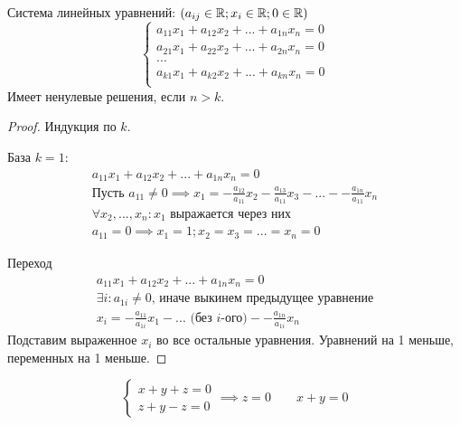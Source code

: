 \documentclass[main]{subfiles}
\begin{document}
\begin{lemma}
    Система линейных уравнений: $(a_{ij} \in \mathbb{R}; x_i \in \mathbb{R}; 0 \in \mathbb{R})$
    \begin{equation*}
        \begin{cases}
            a_{11} x_1 + a_{12}x_2 + ... + a_{1n} x_n = 0 \\
            a_{21} x_1 + a_{22}x_2 + ... + a_{2n} x_n = 0 \\
            ...                                           \\
            a_{k1} x_1 + a_{k2}x_2 + ... + a_{kn} x_n = 0 \\
        \end{cases}
    \end{equation*}
    Имеет ненулевые решения, если $n>k$.
\end{lemma}
\begin{proof}
    Индукция по $k$.

    База $k=1$:
    \begin{gather*}
        a_{11} x_1 + a_{12}x_2 + ... + a_{1n} x_n = 0\\
        \text{Пусть } a_{11} \neq 0 \implies x_1 = -\frac{a_{12}}{a_{11}}x_2
        -\frac{a_{13}}{a_{11}}x_3 - ... - -\frac{a_{1n}}{a_{11}}x_n\\
        \forall x_2,...,x_n: x_1 \text{ выражается через них}\\
        a_{11} = 0 \implies x_1 = 1; x_2=x_3=...=x_n=0
    \end{gather*}

    Переход
    \begin{gather*}
        a_{11} x_1 + a_{12}x_2 + ... + a_{1n} x_n = 0\\
        \exists i: a_{1i} \neq 0 \text{, иначе выкинем предыдущее уравнение}\\
        x_i = -\frac{a_{11}}{a_{1i}}x_1 - ...\text{ (без $i$-ого)} - -\frac{a_{1n}}{a_{1i}}x_n
    \end{gather*}
    Подставим выраженное $x_i$ во все остальные уравнения.
    Уравнений на 1 меньше, переменных на 1 меньше.
\end{proof}
\begin{example}
    \begin{equation*}
        \begin{cases}
            x+y+z=0 \\
            z+y-z=0
        \end{cases}
        \implies z=0 \qquad x+y=0
    \end{equation*}
\end{example}
\end{document}
